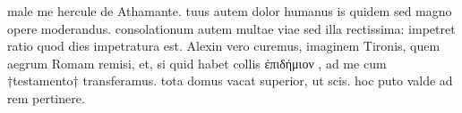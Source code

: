 


 male me hercule de Athamante. tuus autem dolor humanus is quidem sed magno opere moderandus. consolationum autem multae viae sed illa rectissima: impetret ratio quod dies impetratura est. Alexin vero curemus, imaginem Tironis, quem aegrum Romam remisi, et, si quid habet collis ἐπιδήμιον , ad me cum †testamento† transferamus. tota domus vacat superior, ut scis. hoc puto valde ad rem pertinere.
